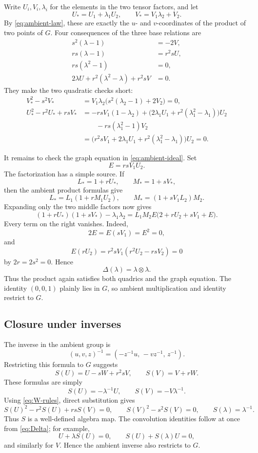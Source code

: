 \documentclass[11pt]{article}
\newcommand{\ot}{\otimes}
\theoremstyle{remark}
\begin{document}
Write \(U_i,V_i,\lambda_i\) for the elements in the two tensor factors, and
let
\[
 U_*=U_1+\lambda_1U_2,
 \qquad
 V_*=V_1\lambda_2+V_2.
\]
By \eqref{eq:ambient-law}, these are exactly the \(u\)- and \(v\)-coordinates
of the product of two points of \(G\).  Four consequences of the three base
relations are
\begin{align}
 s^2(\lambda-1)&=-2V,\label{eq:aux1}\\
 rs(\lambda-1)&=r^2sU,\label{eq:aux2}\\
 rs(\lambda^2-1)&=0,\label{eq:aux3}\\
 2\lambda U+r^2(\lambda^2-\lambda)+r^2sV&=0.\label{eq:aux4}
\end{align}
They make the two quadratic checks short:
\begin{align*}
 V_*^2-s^2V_*
 &=V_1\lambda_2\bigl(s^2(\lambda_2-1)+2V_2\bigr)=0,
\\
 U_*^2-r^2U_*+rsV_*
 &=-rsV_1(1-\lambda_2)
   +\bigl(2\lambda_1U_1+r^2(\lambda_1^2-\lambda_1)\bigr)U_2\\
 &\hspace{2em}-rs(\lambda_1^2-1)V_2\\
 &=\bigl(r^2sV_1+2\lambda_1U_1
          +r^2(\lambda_1^2-\lambda_1)\bigr)U_2=0.
\end{align*}

It remains to check the graph equation in \eqref{eq:ambient-ideal}.  Set
\[
 E=rsV_1U_2.
\]
The factorization has a simple source.  If
\[
 L_*=1+rU_*,\qquad M_*=1+sV_*,
\]
then the ambient product formulas give
\[
 L_*=L_1(1+rM_1U_2),\qquad
 M_*=(1+sV_1L_2)M_2.
\]
Expanding only the two middle factors now gives
\begin{equation}\label{eq:group-like-factor}
 (1+rU_*)(1+sV_*)-\lambda_1\lambda_2
 =L_1M_2E\bigl(2+rU_2+sV_1+E\bigr).
\end{equation}
Every term on the right vanishes.  Indeed,
\[
 2E=E(sV_1)=E^2=0,
\]
and
\[
 E(rU_2)
 =r^2sV_1(r^2U_2-rsV_2)=0
\]
by \(2r=2s^2=0\).  Hence
\[
 \Delta(\lambda)=\lambda\ot\lambda.
\]
Thus the product again satisfies both quadrics and the graph equation.
The identity \((0,0,1)\) plainly lies in \(G\), so ambient multiplication
and identity restrict to \(G\).

\subsection*{Closure under inverses}

The inverse in the ambient group is
\[
 (u,v,z)^{-1}=(-z^{-1}u,\,-vz^{-1},\,z^{-1}).
\]
Restricting this formula to \(G\) suggests
\begin{equation}\label{eq:antipode}
 S(U)=U-sW+r^2sV,\qquad
 S(V)=V+rW.
\end{equation}
These formulas are simply
\[
 S(U)=-\lambda^{-1}U,\qquad
 S(V)=-V\lambda^{-1}.
\]
Using \eqref{eq:W-rules}, direct substitution gives
\[
 S(U)^2-r^2S(U)+rsS(V)=0,\qquad
 S(V)^2-s^2S(V)=0,\qquad
 S(\lambda)=\lambda^{-1}.
\]
Thus \(S\) is a well-defined algebra map.  The convolution identities
follow at once from \eqref{eq:Delta}; for example,
\[
 U+\lambda S(U)=0,\qquad
 S(U)+S(\lambda)U=0,
\]
and similarly for \(V\).  Hence the ambient inverse also restricts to
\(G\).
\end{document}
